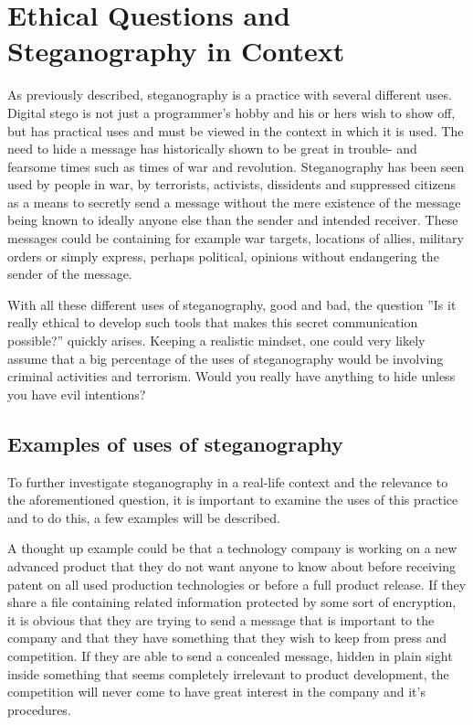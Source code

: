 \section{Ethical Questions and Steganography in Context}
As previously described, steganography is a practice with several different uses.
Digital stego is not just a programmer's hobby and his or hers wish to show off, but has practical uses and must be viewed in the context in which it is used.
The need to hide a message has historically shown to be great in trouble- and fearsome times such as times of war and revolution.
Steganography has been seen used by people in war, by terrorists, activists, dissidents and suppressed citizens as a means to secretly send a message without the mere existence of the message being known to ideally anyone else than the sender and intended receiver.
These messages could be containing for example war targets, locations of allies, military orders or simply express, perhaps political, opinions without endangering the sender of the message.


With all these different uses of steganography, good and bad, the question ''Is it really ethical to develop such tools that makes this secret communication possible?'' quickly arises. Keeping a realistic mindset, one could very likely assume that a big percentage of the uses of steganography would be involving criminal activities and terrorism. Would you really have anything to hide unless you have evil intentions?

\subsection{Examples of uses of steganography}
To further investigate steganography in a real-life context and the relevance to the aforementioned question, it is important to examine the uses of this practice and to do this, a few examples will be described.

A thought up example could be that a technology company is working on a new advanced product that they do not want anyone to know about before receiving patent on all used production technologies or before a full product release.
If they share a file containing related information protected by some sort of encryption, it is obvious that they are trying to send a message that is important to the company and that they have something that they wish to keep from press and competition.
If they are able to send a concealed message, hidden in plain sight inside something that seems completely irrelevant to product development, the competition will never come to have great interest in the company and it's procedures.

